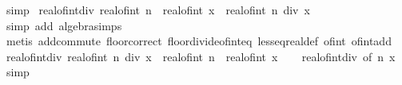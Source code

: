 \begin{isabellebody}
\isamarkupfalse%
\ simp%
\endisatagproof
{\isafoldproof}%
%
\isadelimproof
\isanewline
%
\endisadelimproof
\isanewline
{}\isamarkupfalse%
\ real{\isacharunderscore}{\kern0pt}of{\isacharunderscore}{\kern0pt}int{\isacharunderscore}{\kern0pt}div{}{\isacharcolon}{\kern0pt}\ {\isachardoublequoteopen}real{\isacharunderscore}{\kern0pt}of{\isacharunderscore}{\kern0pt}int\ n\ {\isacharslash}{\kern0pt}\ real{\isacharunderscore}{\kern0pt}of{\isacharunderscore}{\kern0pt}int\ x\ {\isacharminus}{\kern0pt}\ real{\isacharunderscore}{\kern0pt}of{\isacharunderscore}{\kern0pt}int\ {\isacharparenleft}{\kern0pt}n\ div\ x{\isacharparenright}{\kern0pt}\ {\isasymle}\ {}{\isachardoublequoteclose}\isanewline
%
\isadelimproof
\ \ %
\endisadelimproof
%
\isatagproof
{}\isamarkupfalse%
\ {\isacharparenleft}{\kern0pt}simp\ add{\isacharcolon}{\kern0pt}\ algebra{\isacharunderscore}{\kern0pt}simps{\isacharparenright}{\kern0pt}\isanewline
\ \ \isamarkupfalse%
\ {\isacharparenleft}{\kern0pt}metis\ add{\isachardot}{\kern0pt}commute\ floor{\isacharunderscore}{\kern0pt}correct\ floor{\isacharunderscore}{\kern0pt}divide{\isacharunderscore}{\kern0pt}of{\isacharunderscore}{\kern0pt}int{\isacharunderscore}{\kern0pt}eq\ less{\isacharunderscore}{\kern0pt}eq{\isacharunderscore}{\kern0pt}real{\isacharunderscore}{\kern0pt}def\ of{\isacharunderscore}{\kern0pt}int{\isacharunderscore}{\kern0pt}{}\ of{\isacharunderscore}{\kern0pt}int{\isacharunderscore}{\kern0pt}add{\isacharparenright}{\kern0pt}%
\endisatagproof
{\isafoldproof}%
%
\isadelimproof
\isanewline
%
\endisadelimproof
\isanewline
{}\isamarkupfalse%
\ real{\isacharunderscore}{\kern0pt}of{\isacharunderscore}{\kern0pt}int{\isacharunderscore}{\kern0pt}div{}{\isacharcolon}{\kern0pt}\ {\isachardoublequoteopen}real{\isacharunderscore}{\kern0pt}of{\isacharunderscore}{\kern0pt}int\ {\isacharparenleft}{\kern0pt}n\ div\ x{\isacharparenright}{\kern0pt}\ {\isasymle}\ real{\isacharunderscore}{\kern0pt}of{\isacharunderscore}{\kern0pt}int\ n\ {\isacharslash}{\kern0pt}\ real{\isacharunderscore}{\kern0pt}of{\isacharunderscore}{\kern0pt}int\ x{\isachardoublequoteclose}\isanewline
%
\isadelimproof
\ \ %
\endisadelimproof
%
\isatagproof
{}\isamarkupfalse%
\ real{\isacharunderscore}{\kern0pt}of{\isacharunderscore}{\kern0pt}int{\isacharunderscore}{\kern0pt}div{}\ {\isacharbrackleft}{\kern0pt}of\ n\ x{\isacharbrackright}{\kern0pt}\ \isamarkupfalse%
\ simp%
\endisatagproof
{\isafoldproof}%
%
\isadelimproof

\end{isabellebody}
